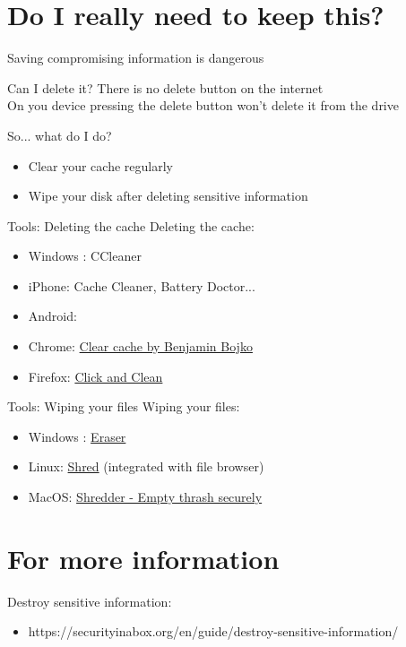 \documentclass[11pt]{beamer}
\begin{document}
\section{Do I really need to  keep  this?}
\begin{frame}
Saving compromising information is dangerous
\end{frame}
\begin{frame}{Can I delete it?}
There is no delete button on the internet\\
On you device pressing the delete button won't delete  it from the drive
\end{frame}
\begin{frame}{So... what do I do?}
\begin{itemize}
\item Clear your cache regularly
\item Wipe your  disk after deleting sensitive information
\end{itemize}
\end{frame}
\begin{frame}{Tools: Deleting the cache}
Deleting the cache:
\begin{itemize}
\item Windows : CCleaner
\item iPhone: Cache Cleaner, Battery Doctor...
\item Android: 
\item Chrome: \href{https://chrome.google.com/webstore/detail/clear-cache/cppjkneekbjaeellbfkmgnhonkkjfpdn}{Clear cache by Benjamin Bojko}
\item Firefox: \href{https://www.hotcleaner.com/clickclean_firefox.html}{Click and Clean}
\end{itemize}
\end{frame}
\begin{frame}{Tools: Wiping your files}
Wiping your files:
\begin{itemize}
\item Windows : \href{https://eraser.heidi.ie/}{Eraser}
\item Linux: \href{http://www.ubuntugeek.com/tools-to-delete-files-securely-in-ubuntu-linux.html}{Shred} (integrated with file browser)
\item MacOS: \href{http://www.brighthub.com/computing/mac-platform/articles/72748.aspx}{Shredder - Empty thrash securely}
\end{itemize}
\end{frame}

\section{For more information}
\begin{frame}
Destroy sensitive information:
\begin{itemize}
\item https://securityinabox.org/en/guide/destroy-sensitive-information/
\end{itemize}
\end{frame}
\end{document}
